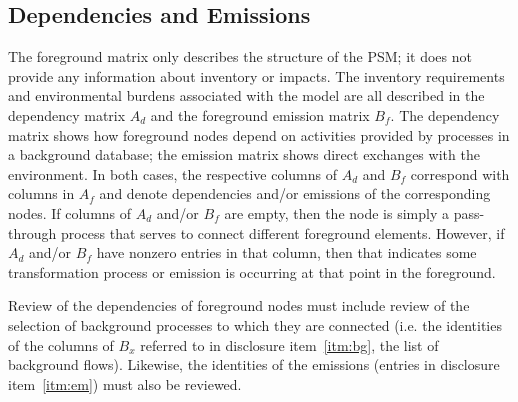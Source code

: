 \subsection{Dependencies and Emissions}

The foreground matrix only describes the structure of the PSM; it does not provide any information about inventory or impacts.  The inventory requirements and environmental burdens associated with the model are all described in the dependency matrix $A_d$ and the foreground emission matrix $B_f$.  The dependency matrix shows how foreground nodes depend on activities provided by processes in a background database; the emission matrix shows direct exchanges with the environment.  In both cases, the respective columns of $A_d$ and $B_f$ correspond with columns in $A_f$ and denote dependencies and/or emissions of the corresponding nodes.  If columns of $A_d$ and/or $B_f$ are empty, then the node is simply a pass-through process that serves to connect different foreground elements.  However, if $A_d$ and/or $B_f$ have nonzero entries in that column, then that indicates some transformation process or emission is occurring at that point in the foreground.  

Review of the dependencies of foreground nodes must include review of the selection of background processes to which they are connected (i.e. the identities of the columns of $B_x$ referred to in disclosure item~\ref{itm:bg}, the list of background flows). Likewise, the identities of the emissions (entries in disclosure item~\ref{itm:em}) must also be reviewed.

